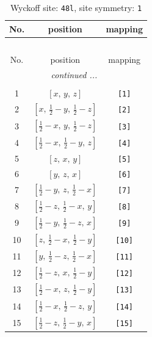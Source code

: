 \documentclass[fleqn,8pt]{jsarticle}
\begin{document}
\begin{longtable}{ccc}
\caption{Wyckoff site: {\tt 48l}, site symmetry: {\tt 1}}
 \\
 \hline \hline
No. & position & mapping \\ \hline \endfirsthead

\multicolumn{2}{l}{\tablename\ \thetable{}} \\
 \hline \hline
No. & position & mapping \\ \hline \endhead

 \hline \hline
\multicolumn{2}{r}{\footnotesize\it continued ...} \\ \endfoot

 \hline \hline
\multicolumn{2}{r}{} \\ \endlastfoot

1 & $\left[ x,\, y,\, z \right]$ & {\tt [1]} \\ \hline
2 & $\left[ x,\, \frac{1}{2} - y,\, \frac{1}{2} - z \right]$ & {\tt [2]} \\ \hline
3 & $\left[ \frac{1}{2} - x,\, y,\, \frac{1}{2} - z \right]$ & {\tt [3]} \\ \hline
4 & $\left[ \frac{1}{2} - x,\, \frac{1}{2} - y,\, z \right]$ & {\tt [4]} \\ \hline
5 & $\left[ z,\, x,\, y \right]$ & {\tt [5]} \\ \hline
6 & $\left[ y,\, z,\, x \right]$ & {\tt [6]} \\ \hline
7 & $\left[ \frac{1}{2} - y,\, z,\, \frac{1}{2} - x \right]$ & {\tt [7]} \\ \hline
8 & $\left[ \frac{1}{2} - z,\, \frac{1}{2} - x,\, y \right]$ & {\tt [8]} \\ \hline
9 & $\left[ \frac{1}{2} - y,\, \frac{1}{2} - z,\, x \right]$ & {\tt [9]} \\ \hline
10 & $\left[ z,\, \frac{1}{2} - x,\, \frac{1}{2} - y \right]$ & {\tt [10]} \\ \hline
11 & $\left[ y,\, \frac{1}{2} - z,\, \frac{1}{2} - x \right]$ & {\tt [11]} \\ \hline
12 & $\left[ \frac{1}{2} - z,\, x,\, \frac{1}{2} - y \right]$ & {\tt [12]} \\ \hline
13 & $\left[ \frac{1}{2} - x,\, z,\, \frac{1}{2} - y \right]$ & {\tt [13]} \\ \hline
14 & $\left[ \frac{1}{2} - x,\, \frac{1}{2} - z,\, y \right]$ & {\tt [14]} \\ \hline
15 & $\left[ \frac{1}{2} - z,\, \frac{1}{2} - y,\, x \right]$ & {\tt [15]} \\ \hline

\end{longtable}
\end{document}
